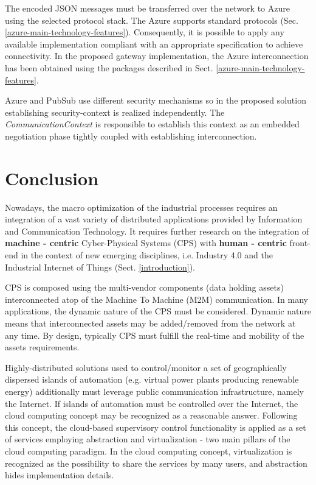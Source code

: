 \documentclass[runningheads]{llncs}
\begin{document}
The encoded JSON messages must be transferred over the network to Azure using the selected protocol stack. The Azure supports standard protocols (Sec. \ref{azure-main-technology-features}). Consequently, it is possible to apply any available implementation compliant with an appropriate specification to achieve connectivity. In the proposed gateway implementation, the Azure interconnection has been obtained using the packages described in Sect. \ref{azure-main-technology-features}.

Azure and PubSub use different security mechanisms so in the proposed solution establishing security-context is realized independently. The \emph{CommunicationContext} is responsible to establish this context as an embedded negotiation phase tightly coupled with establishing interconnection.

\section{Conclusion}\label{section.conclusion}

Nowadays, the macro optimization of the industrial processes requires an integration of a vast variety of distributed applications provided by Information and Communication Technology. It requires further research on the integration of \textbf{machine - centric} Cyber-Physical Systems (CPS) with \textbf{human - centric} front-end in the context of new emerging disciplines, i.e. Industry 4.0 and the Industrial Internet of Things (Sect. \ref{introduction}).

CPS is composed using the multi-vendor components (data holding assets) interconnected atop of the Machine To Machine (M2M) communication. In many applications, the dynamic nature of the CPS must be considered. Dynamic nature means that interconnected assets may be added/removed from the network at any time. By design, typically CPS must fulfill the real-time and mobility of the assets requirements.

Highly-distributed solutions used to control/monitor a set of geographically dispersed islands of automation (e.g. virtual power plants producing renewable energy) additionally must leverage public communication infrastructure, namely the Internet. If islands of automation must be controlled over the Internet, the cloud computing concept may be recognized as a reasonable answer. Following this concept, the cloud-based supervisory control functionality is applied as a set of services employing abstraction and virtualization - two main pillars of the cloud computing paradigm. In the cloud computing concept, virtualization is recognized as the possibility to share the services by many users, and abstraction hides implementation details.
\end{document}
